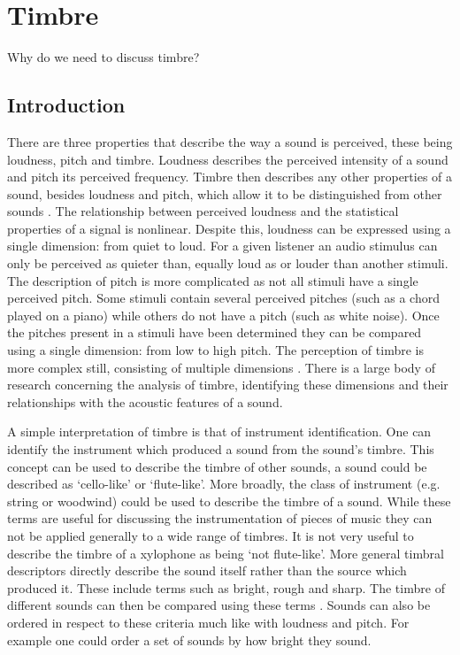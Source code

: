 
\chapter{Timbre}
\label{chap:Timbre}

	\note
	{
		Why do we need to discuss timbre?
	}

\section{Introduction}
\label{sec:Timbre-Introduction}
	There are three properties that describe the way a sound is perceived, these being loudness, pitch and timbre.
	Loudness describes the perceived intensity of a sound and pitch its perceived frequency. Timbre then describes any
	other properties of a sound, besides loudness and pitch, which allow it to be distinguished from other sounds
	\citep{mathews1999introduction}. The relationship between perceived loudness and the statistical properties of a
	signal is nonlinear. Despite this, loudness can be expressed using a single dimension: from quiet to loud. For a
	given listener an audio stimulus can only be perceived as quieter than, equally loud as or louder than another
	stimuli. The description of pitch is more complicated as not all stimuli have a single perceived pitch. Some
	stimuli contain several perceived pitches (such as a chord played on a piano) while others do not have a pitch
	(such as white noise). Once the pitches present in a stimuli have been determined they can be compared using a
	single dimension: from low to high pitch. The perception of timbre is more complex still, consisting of multiple
	dimensions \citep{rossing2002the}. There is a large body of research concerning the analysis of timbre, identifying
	these dimensions and their relationships with the acoustic features of a sound.

	A simple interpretation of timbre is that of instrument identification. One can identify the instrument which
	produced a sound from the sound's timbre. This concept can be used to describe the timbre of other sounds, a sound
	could be described as `cello-like' or `flute-like'. More broadly, the class of instrument (e.g. string or woodwind)
	could be used to describe the timbre of a sound. While these terms are useful for discussing the instrumentation of
	pieces of music they can not be applied generally to a wide range of timbres. It is not very useful to describe the
	timbre of a xylophone as being `not flute-like'. More general timbral descriptors directly describe the sound
	itself rather than the source which produced it. These include terms such as bright, rough and sharp. The timbre of
	different sounds can then be compared using these terms \citep{howard2009acoustics}. Sounds can also be ordered in
	respect to these criteria much like with loudness and pitch. For example one could order a set of sounds by how
	bright they sound.

